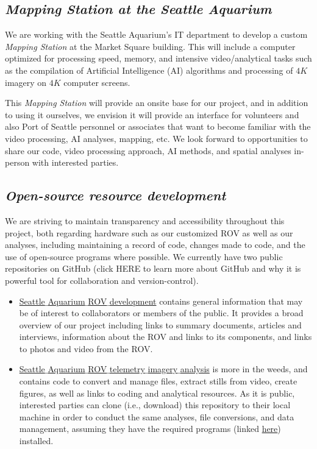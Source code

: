 \documentclass[11pt]{article}
\begin{document}
\subsection{\textit{Mapping Station at the Seattle Aquarium}}
We are working with the Seattle Aquarium's IT department to develop a 
custom \textit{Mapping Station} at the Market Square building. 
This will include a computer optimized for processing speed, memory, 
and intensive video/analytical tasks such as the compilation of 
Artificial Intelligence (AI) algorithms and processing of $4K$ 
imagery on $4K$ computer screens. 

This \textit{Mapping Station} will provide an onsite base for our 
project, and in addition to using it ourselves, we envision it will 
provide an interface for volunteers and also Port of Seattle personnel 
or associates that want to become familiar with the video processing, 
AI analyses, mapping, etc. 
We look forward to opportunities to share our code, video processing 
approach, AI methods, and spatial analyses in-person with interested 
parties.

\subsection{\textit{Open-source resource development}}
We are striving to maintain transparency and accessibility throughout 
this project, both regarding hardware such as our customized ROV as 
well as our analyses, including maintaining a record of code, changes 
made to code, and the use of open-source programs where possible.
We currently have two public repositories on GitHub (click HERE to 
learn more about GitHub and why it is powerful tool for collaboration 
and version-control). 

\begin{itemize}
\item 
\href{https://github.com/zhrandell/Seattle_Aquarium_ROV_development}{Seattle$\_$Aquarium$\_$ROV$\_$development}
contains general information that may be of interest to collaborators 
or members of the public.  
It provides a broad overview of our project including links to summary 
documents, articles and interviews, information about the ROV and links 
to its components, and links to photos and video from the ROV. 
\item
\href{https://github.com/zhrandell/Seattle_Aquarium_ROV_telemetry_imagery_analysis}{Seattle$\_$Aquarium$\_$ROV$\_$telemetry$\_$imagery$\_$analysis}
is more in the weeds, and contains code to convert and manage files, 
extract stills from video, create figures, as well as links to coding 
and analytical resources. 
As it is public, interested parties can clone (i.e., download) this 
repository to their local machine in order to conduct the same 
analyses, file conversions, and data management, assuming they have the 
required programs (linked 
\href{https://github.com/zhrandell/Seattle_Aquarium_ROV_development/blob/main/documents/hardware_software.md#rov-firmware-flight-programs--analytical-software}{here})
 installed.  
\end{itemize}
\end{document}
